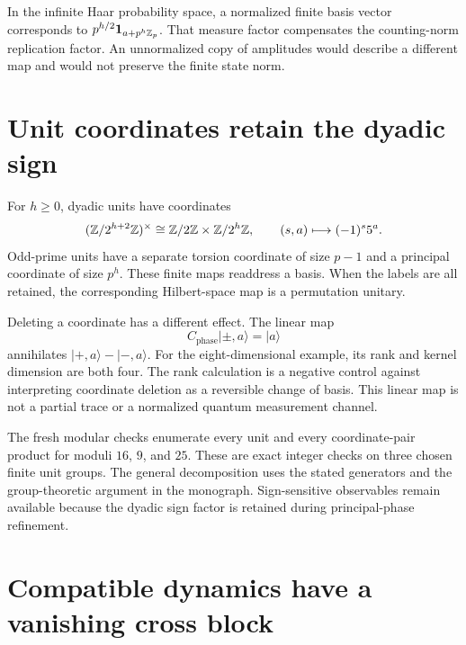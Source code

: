 In the infinite Haar probability space, a normalized finite basis vector corresponds to $p^{h/2}\mathbf1_{a+p^h\mathbb Z_p}$. That measure factor compensates the counting-norm replication factor. An unnormalized copy of amplitudes would describe a different map and would not preserve the finite state norm.



\clearpage
\section{Unit coordinates retain the dyadic sign}

For $h\ge0$, dyadic units have coordinates
\[
(\mathbb Z/2^{h+2}\mathbb Z)^\times
\cong\mathbb Z/2\mathbb Z\times\mathbb Z/2^h\mathbb Z,
\qquad(s,a)\longmapsto(-1)^s5^a.
\]
Odd-prime units have a separate torsion coordinate of size $p-1$ and a principal coordinate of size $p^h$. These finite maps readdress a basis. When the labels are all retained, the corresponding Hilbert-space map is a permutation unitary.

Deleting a coordinate has a different effect. The linear map
\[
C_{\mathrm{phase}}|\pm,a\rangle=|a\rangle
\]
annihilates $|+,a\rangle-|-,a\rangle$. For the eight-dimensional example, its rank and kernel dimension are both four. The rank calculation is a negative control against interpreting coordinate deletion as a reversible change of basis. This linear map is not a partial trace or a normalized quantum measurement channel.

The fresh modular checks enumerate every unit and every coordinate-pair product for moduli $16$, $9$, and $25$. These are exact integer checks on three chosen finite unit groups. The general decomposition uses the stated generators and the group-theoretic argument in the monograph. Sign-sensitive observables remain available because the dyadic sign factor is retained during principal-phase refinement.



\clearpage
\section{Compatible dynamics have a vanishing cross block}

